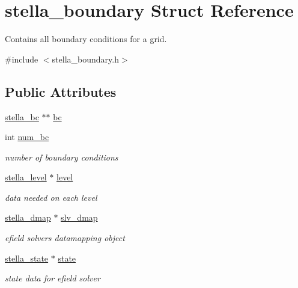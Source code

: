 \hypertarget{structstella__boundary}{}\section{stella\+\_\+boundary Struct Reference}
\label{structstella__boundary}


Contains all boundary conditions for a grid.  




{\ttfamily \#include $<$stella\+\_\+boundary.\+h$>$}

\subsection*{Public Attributes}
\begin{DoxyCompactItemize}
\item 
\mbox{\hyperlink{stella__bc_8h_a8eccc1c3c3d83359ed0a620a0856d0ea}{stella\+\_\+bc}} $\ast$$\ast$ \mbox{\hyperlink{structstella__boundary_af712b858f672194c13f7e0ce86537f25}{bc}}
\item 
int \mbox{\hyperlink{structstella__boundary_a55a9f53e7fdf2f2f8022fc16aec14d30}{num\+\_\+bc}}
\begin{DoxyCompactList}\small\item\em number of boundary conditions \end{DoxyCompactList}\item 
\mbox{\hyperlink{structstella__level}{stella\+\_\+level}} $\ast$ \mbox{\hyperlink{structstella__boundary_a38bf65e2918d41490b536af9478d97be}{level}}
\begin{DoxyCompactList}\small\item\em data needed on each level \end{DoxyCompactList}\item 
\mbox{\hyperlink{structstella__dmap}{stella\+\_\+dmap}} $\ast$ \mbox{\hyperlink{structstella__boundary_ad7a6e474dfc00d9200c215d2a2799d85}{slv\+\_\+dmap}}
\begin{DoxyCompactList}\small\item\em efield solver\textquotesingle{}s datamapping object \end{DoxyCompactList}\item 
\mbox{\hyperlink{structstella__state}{stella\+\_\+state}} $\ast$ \mbox{\hyperlink{structstella__boundary_ae7b56bc4c6920cc10b7a433814d97713}{state}}
\begin{DoxyCompactList}\small\item\em state data for efield solver \end{DoxyCompactList}\item 
$$
\end{DoxyCompactItemize}
